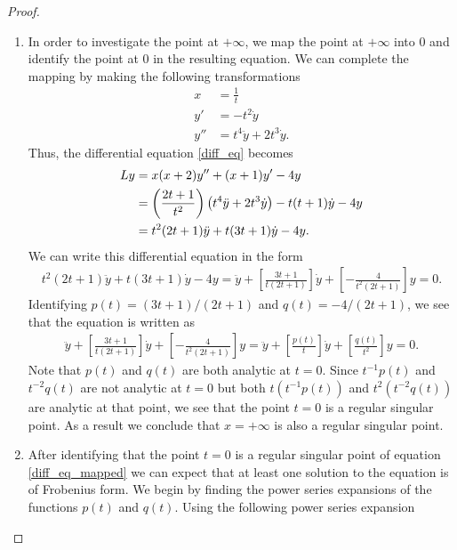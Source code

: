 \documentclass[12pt]{article}
\theoremstyle{definition}
\begin{document}
\begin{proof}
  \begin{enumerate}
    \item In order to investigate the point at $+\infty$, we map the point at
      $+\infty$ into $0$ and identify the point at $0$ in the resulting equation.
      We can complete the mapping by making the following transformations
      \begin{align*}
        x &= \frac{1}{t} \\
        y' &= -t^2 \dot{y} \\
        y'' &= t^4 \ddot{y} + 2t^3 \dot{y}.
      \end{align*}
      Thus, the differential equation \eqref{diff_eq} becomes
      \begin{align*}
        Ly &= x(x+2)y'' + (x+1)y' - 4y \notag \\
        &= \left(\frac{2t+1}{t^2}\right)\left(t^4 \ddot{y} + 2t^3 \dot{y}\right) -t(t + 1)\dot{y} - 4y \notag \\
        &= t^2(2t+1)\ddot{y} + t(3t+1)\dot{y} - 4y.
      \end{align*}
      We can write this differential equation in the form
      \begin{align}\label{diff_eq_mapped}
        t^2(2t+1)\ddot{y} + t(3t+1)\dot{y} - 4y = \ddot{y} + \left[\frac{3t+1}{t(2t+1)}\right]\dot{y} + \left[-\frac{4}{t^2(2t+1)}\right]y=0.
      \end{align}
      Identifying $p(t) = (3t+1)/(2t+1)$ and $q(t) = -4/(2t+1)$, we see that the equation is written as
      \begin{align*}
        \ddot{y} + \left[\frac{3t+1}{t(2t+1)}\right]\dot{y} + \left[-\frac{4}{t^2(2t+1)}\right]y = \ddot{y} + \left[\frac{p(t)}{t}\right]\dot{y} + \left[\frac{q(t)}{t^2}\right]y = 0.
      \end{align*}
      Note that $p(t)$ and $q(t)$ are both analytic at $t=0$.
      Since $t^{-1}p(t)$ and $t^{-2}q(t)$ are not analytic at $t=0$ but both
      $t(t^{-1}p(t))$ and $t^2(t^{-2}q(t))$ are analytic at that point, we
      see that the point $t=0$ is a regular singular point. As a result
      we conclude that $x=+\infty$ is also a regular singular point.
    \item After identifying that the point $t=0$ is a regular singular point of
      equation \eqref{diff_eq_mapped} we can expect that at least one solution to the equation
      is of Frobenius form. We begin by finding the power series expansions
      of the functions $p(t)$ and $q(t)$. Using the following power series expansion

\end{enumerate}
\end{proof}
\end{document}
